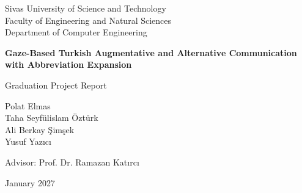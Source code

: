 \documentclass[12pt,a4paper,oneside]{report}
\begin{document}
\begin{titlepage}
  \centering
  {\large Sivas University of Science and Technology\\
  Faculty of Engineering and Natural Sciences\\
  Department of Computer Engineering\par}
  \vspace{3cm}
  {\LARGE\bfseries Gaze-Based Turkish Augmentative and Alternative Communication with Abbreviation Expansion\par}
  \vspace{1cm}
  {\large Graduation Project Report\par}
  \vspace{2cm}
  {\large
  Polat Elmas\\[0.3em]
  Taha Seyfülislam Öztürk\\[0.3em]
  Ali Berkay Şimşek\\[0.3em]
  Yusuf Yazıcı\par}
  \vspace{1.5cm}
  {\large Advisor: Prof. Dr. Ramazan Katırcı\par}
  \vfill
  {\large January 2027\par}
\end{titlepage}


\tableofcontents
\listoffigures
\listoftables

\clearpage
{}












\appendix

\end{document}
